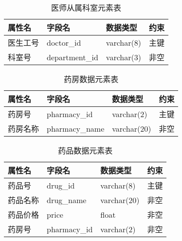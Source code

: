 \documentclass{article}
\begin{document}
\begin{table}[H]
    \centering
    \begin{tabularx}{\textwidth}{|>{\raggedright\arraybackslash}X|>{\raggedright\arraybackslash}X|>{\raggedright\arraybackslash}X|>{\raggedright\arraybackslash}X|}
    \toprule
    \textbf{属性名} & \textbf{字段名} & \textbf{数据类型} & \textbf{约束} \\ \midrule
    医生工号 & doctor\_id & varchar(8) & 主键 \\ \midrule
    科室号 & department\_id & varchar(3) & 非空 \\ \bottomrule
    \end{tabularx}
    \caption{医师从属科室元素表}
    \label{tab:doctor_elements}
\end{table}

\begin{table}[H]
    \centering
    \begin{tabularx}{\textwidth}{|>{\raggedright\arraybackslash}X|>{\raggedright\arraybackslash}X|>{\raggedright\arraybackslash}X|>{\raggedright\arraybackslash}X|}
    \toprule
    \textbf{属性名} & \textbf{字段名} & \textbf{数据类型} & \textbf{约束} \\ \midrule
    药房号 & pharmacy\_id & varchar(2) & 主键 \\ \midrule
    药房名称 & pharmacy\_name & varchar(20) & 非空 \\ \bottomrule
    \end{tabularx}
    \caption{药房数据元素表}
    \label{tab:pharmacy_elements}
\end{table}

\begin{table}[H]
    \centering
    \begin{tabularx}{\textwidth}{|>{\raggedright\arraybackslash}X|>{\raggedright\arraybackslash}X|>{\raggedright\arraybackslash}X|>{\raggedright\arraybackslash}X|}
    \toprule
    \textbf{属性名} & \textbf{字段名} & \textbf{数据类型} & \textbf{约束} \\ \midrule
    药品号 & drug\_id & varchar(8) & 主键 \\ \midrule
    药品名称 & drug\_name & varchar(20) & 非空 \\ \midrule
    药品价格 & price & float & 非空 \\ \midrule
    药房号 & pharmacy\_id & varchar(2) & 非空 \\ \bottomrule
    \end{tabularx}
    \caption{药品数据元素表}
    \label{tab:drug_elements}
\end{table}
\end{document}

